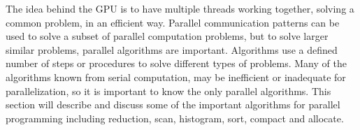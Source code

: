 The idea behind the GPU is to have multiple threads working together, solving a common problem, in an efficient way. Parallel communication patterns can be used to solve a subset of parallel computation problems, but to solve larger similar problems, parallel algorithms are important. Algorithms use a defined number of steps or procedures to solve different types of problems. Many of the algorithms known from serial computation, may be inefficient or inadequate for parallelization, so it is important to know the only parallel algorithms. This section will describe and discuss some of the important algorithms for parallel programming including reduction, scan, histogram, sort, compact and allocate.   